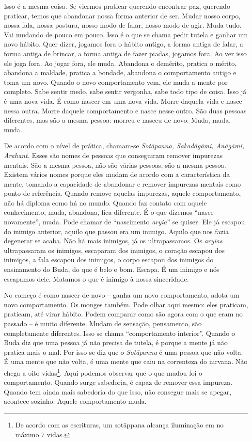 Isso é a mesma coisa. Se viermos praticar querendo encontrar paz,
querendo praticar, temos que abandonar nossa forma anterior de ser.
Mudar nosso corpo, nossa fala, nossa postura, nosso modo de falar,
nosso modo de agir. Muda tudo. Vai mudando de pouco em pouco. Isso é o
que se chama pedir tutela e ganhar um novo hábito. Quer dizer, jogamos
fora o hábito antigo, a forma antiga de falar, a forma antiga de
brincar, a forma antiga de fazer piadas, jogamos fora. Ao ver isso ele
joga fora. Ao jogar fora, ele muda. Abandona o demérito, pratica o
mérito, abandona a maldade, pratica a bondade, abandona o comportamento
antigo e toma um novo. Quando o novo comportamento vem, ele muda a
mente por completo. Sabe sentir medo, sabe sentir vergonha, sabe todo
tipo de coisa. Isso já é uma nova vida. É como nascer em uma nova vida.
Morre daquela vida e nasce nessa outra. Morre daquele comportamento e
nasce nesse outro. São duas pessoas diferentes, mas são a mesma pessoa:
morreu e nasceu de novo. Muda, muda, muda. 

De acordo com o nível de prática, chamam-se \textit{Sotāpanna,
Sakadāgāmi, Anāgāmī, Arahant.} Esses são nomes de pessoas
que conseguiram remover impurezas mentais. São a mesma pessoa, não são
várias pessoas, são a mesma pessoa. Existem vários nomes porque eles
mudam de acordo com a característica da mente, tomando a capacidade de
abandonar e remover impurezas mentais como ponto de referência. Quando
remove aquelas impurezas, aquele comportamento, não há diploma como há
no mundo. Quando faz contato com aquele conhecimento, muda, abandona,
fica diferente. É o que dizemos “nasce novamente”, muda. Pode chamar de
“nascimento \textit{aryia}” se quiser. Ele já escapou do inimigo
anterior, aquilo que passou era um inimigo. Aquilo que nos fazia
degenerar se acaba. Não há mais inimigos, já os ultrapassamos. Os
\textit{aryias} ultrapassaram os inimigos, escaparam dos inimigos, o
coração escapou dos inimigos, a fala escapou dos inimigos, o corpo
escapou dos inimigos do ensinamento do Buda, do que é belo e bom.
Escapa. É um inimigo e nós escapamos dele. Matamos o que é inimigo à
nossa sinceridade. 

No começo é como nascer de novo – ganha um novo comportamento, adota
um novo comportamento. Os monges também. Pode olhar aqui mesmo: eles
praticam, praticam, até virar hábito. Podem comparar como são agora com
o que eram no passado – é muito diferente. Mudam de sensação,
pensamento, são completamente diferentes. Isso se chama “comportamento
interior”. Quando o Buda diz que uma pessoa já não precisa de tutela, é
porque a mente já não pratica mais o mal. Por isso se diz que o
\textit{Sotāpanna} é uma pessoa que não volta. É uma mente que não
volta, é uma mente que caiu na correnteza do nirvana. Não chega a oito
vidas\footnote{De acordo com as escrituras, um sotāppana alcança
iluminação em no máximo 7 vidas.}. Aqui podemos observar que o que
mudou foi o comportamento. Quando surge sabedoria, é capaz de remover
essa impureza. Quando tem ainda mais sabedoria do que isso, não
consegue mais se apegar, acontece sozinho. Aquele comportamento muda. 

